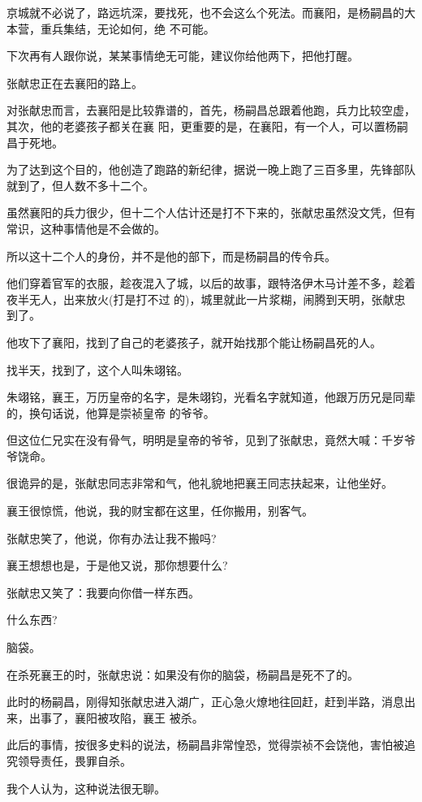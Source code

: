 \documentclass[11pt,a4paper,onecolumn]{article}
\begin{document}
京城就不必说了，路远坑深，要找死，也不会这么个死法。而襄阳，是杨嗣昌的大本营，重兵集结，无论如何，绝
不可能。

下次再有人跟你说，某某事情绝无可能，建议你给他两下，把他打醒。

张献忠正在去襄阳的路上。

对张献忠而言，去襄阳是比较靠谱的，首先，杨嗣昌总跟着他跑，兵力比较空虚，其次，他的老婆孩子都关在襄
阳，更重要的是，在襄阳，有一个人，可以置杨嗣昌于死地。

为了达到这个目的，他创造了跑路的新纪律，据说一晚上跑了三百多里，先锋部队就到了，但人数不多\myrule 十二个。

虽然襄阳的兵力很少，但十二个人估计还是打不下来的，张献忠虽然没文凭，但有常识，这种事情他是不会做的。

所以这十二个人的身份，并不是他的部下，而是杨嗣昌的传令兵。

他们穿着官军的衣服，趁夜混入了城，以后的故事，跟特洛伊木马计差不多，趁着夜半无人，出来放火(打是打不过
的)，城里就此一片浆糊，闹腾到天明，张献忠到了。

他攻下了襄阳，找到了自己的老婆孩子，就开始找那个能让杨嗣昌死的人。

找半天，找到了，这个人叫朱翊铭。

朱翊铭，襄王，万历皇帝的名字，是朱翊钧，光看名字就知道，他跟万历兄是同辈的，换句话说，他算是崇祯皇帝
的爷爷。

但这位仁兄实在没有骨气，明明是皇帝的爷爷，见到了张献忠，竟然大喊：千岁爷爷饶命。

很诡异的是，张献忠同志非常和气，他礼貌地把襄王同志扶起来，让他坐好。

襄王很惊慌，他说，我的财宝都在这里，任你搬用，别客气。

张献忠笑了，他说，你有办法让我不搬吗?

襄王想想也是，于是他又说，那你想要什么?

张献忠又笑了：我要向你借一样东西。

什么东西?

脑袋。

在杀死襄王的时，张献忠说：如果没有你的脑袋，杨嗣昌是死不了的。

此时的杨嗣昌，刚得知张献忠进入湖广，正心急火燎地往回赶，赶到半路，消息出来，出事了，襄阳被攻陷，襄王
被杀。

此后的事情，按很多史料的说法，杨嗣昌非常惶恐，觉得崇祯不会饶他，害怕被追究领导责任，畏罪自杀。

我个人认为，这种说法很无聊。

\section[\thesection]{}
\end{document}
